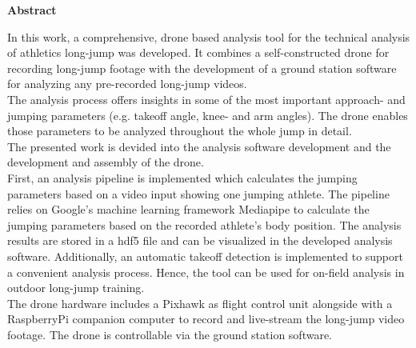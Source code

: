 \thispagestyle{empty}
\vspace*{\fill}
\begin{center}
        \textbf{Abstract}
\end{center}
In this work, a comprehensive, drone based analysis tool for the technical
analysis of athletics long-jump was developed.
It combines a self-constructed drone for recording long-jump footage with the
development of a ground station software for analyzing any pre-recorded
long-jump videos.\\
The analysis process offers insights in some of the most important approach-
and jumping parameters (e.g. takeoff angle, knee- and arm angles).
The drone enables those parameters to be analyzed throughout the whole jump
in detail.\\
The presented work is devided into the analysis software development and the
development and assembly of the drone.\\
First, an analysis pipeline is implemented which calculates the jumping
parameters based on a video input showing one jumping athlete. 
The pipeline relies on Google's machine learning framework Mediapipe to
calculate the jumping parameters based on the recorded athlete's body
position.
The analysis results are stored in a hdf5 file and can be visualized in the
developed analysis software.
Additionally, an automatic takeoff detection is implemented to support a
convenient analysis process.
Hence, the tool can be used for on-field analysis in outdoor long-jump
training.\\
The drone hardware includes a Pixhawk as flight control unit alongside with
a RaspberryPi companion computer to record and live-stream the long-jump video
footage.
The drone is controllable via the ground station software.\\ 
\vfill

